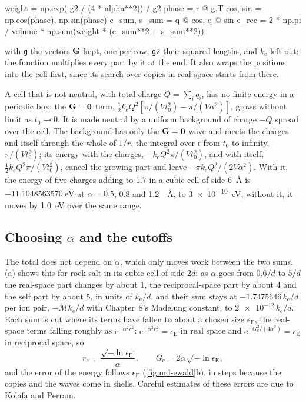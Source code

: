 \begin{code}
    weight = np.exp(-g2 / (4 * alpha**2)) / g2
    phase = r @ g.T
    cos, sin = np.cos(phase), np.sin(phase)
    c_sum, s_sum = q @ cos, q @ sin
    e_rec = 2 * np.pi / volume * np.sum(weight * (c_sum**2 + s_sum**2))
\end{code}

\noindent with \texttt{g} the vectors $\bm{\mathrm{G}}$ kept, one per row,
\texttt{g2} their squared lengths, and $k_{\mathrm e}$ left out: the
function multiplies every part by it at the end. It also wraps the
positions into the cell first, since its search over copies in real space
starts from there.

A cell that is not neutral, with total charge $Q = \sum_iq_i$, has no
finite energy in a periodic box: the $\bm{\mathrm{G}} = \bm{\mathrm{0}}$ term,
$\frac12k_{\mathrm e}Q^2[\pi/(Vt_0^2) - \pi/(V\alpha^2)]$, grows without
limit as $t_0 \to 0$. It is made neutral by a uniform background of charge
$-Q$ spread over the cell. The background has only the $\bm{\mathrm{G}} = \bm{\mathrm{0}}$
wave and meets the charges and itself through the whole of $1/r$, the
integral over $t$ from $t_0$ to infinity, $\pi/(Vt_0^2)$; its energy with
the charges, $-k_{\mathrm e}Q^2\pi/(Vt_0^2)$, and with itself,
$\frac12k_{\mathrm e}Q^2\pi/(Vt_0^2)$, cancel the growing part and leave
$-\pi k_{\mathrm e}Q^2/(2V\alpha^2)$. With it, the energy of five charges
adding to 1.7 in a cubic cell of side \SI{6}{\angstrom} is
$\SI{-11.1048563570}{\electronvolt}$ at $\alpha = 0.5$, 0.8 and
\SI{1.2}{\per\angstrom}, to \SI{3e-10}{\electronvolt}; without it, it moves
by \SI{1.0}{\electronvolt} over the same range.

\subsection*{Choosing \texorpdfstring{$\alpha$}{alpha} and the cutoffs}

The total does not depend on $\alpha$, which only moves work between the
two sums. (a) shows this for rock salt in its cubic
cell of side $2d$: as $\alpha$ goes from $0.6/d$ to $5/d$ the real-space
part changes by about 1, the reciprocal-space part by about 4 and the
self part by about 5, in units of $k_{\mathrm e}/d$, and their sum stays
at $-1.7475646\,k_{\mathrm e}/d$ per ion pair, $-\mathcal{M}k_{\mathrm
e}/d$ with Chapter~8's Madelung constant\cite{Evjen1932}, to
$\num{2e-12}\,k_{\mathrm e}/d$. Each sum is cut where its terms have
fallen to about a chosen size $\epsilon_{\mathrm E}$, the real-space terms
falling roughly as $\mathrm{e}^{-\alpha^2r^2}$: $\mathrm{e}^{-\alpha^2
r_{\mathrm c}^2} = \epsilon_{\mathrm E}$ in real space and
$\mathrm{e}^{-G_{\mathrm c}^2/(4\alpha^2)} = \epsilon_{\mathrm E}$ in
reciprocal space, so
\begin{equation*}
   r_{\mathrm c} = \frac{\sqrt{-\ln\epsilon_{\mathrm E}}}{\alpha} ,
   \qquad
   G_{\mathrm c} = 2\alpha\sqrt{-\ln\epsilon_{\mathrm E}} ,
\end{equation*}
and the error of the energy follows $\epsilon_{\mathrm E}$
(\cref{fig:md-ewald}b), in steps because the copies and the waves come in
shells. Careful estimates of these errors are due to Kolafa and
Perram\cite{KolafaPerram1992}.


